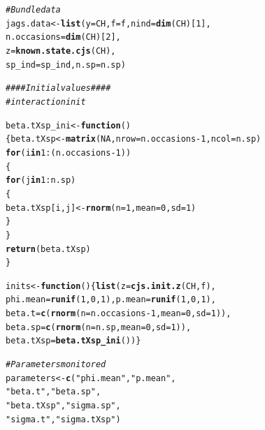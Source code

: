 \documentclass[a4paper, 10pt]{scrartcl}\usepackage[]{graphicx}\usepackage[]{color}
\makeatletter
\newcommand{\hlnum}[1]{\textcolor[rgb]{0.686,0.059,0.569}{#1}}%
\newcommand{\hlstr}[1]{\textcolor[rgb]{0.192,0.494,0.8}{#1}}%
\newcommand{\hlcom}[1]{\textcolor[rgb]{0.678,0.584,0.686}{\textit{#1}}}%
\newcommand{\hlopt}[1]{\textcolor[rgb]{0,0,0}{#1}}%
\newcommand{\hlstd}[1]{\textcolor[rgb]{0.345,0.345,0.345}{#1}}%
\newcommand{\hlkwa}[1]{\textcolor[rgb]{0.161,0.373,0.58}{\textbf{#1}}}%
\newcommand{\hlkwb}[1]{\textcolor[rgb]{0.69,0.353,0.396}{#1}}%
\newcommand{\hlkwc}[1]{\textcolor[rgb]{0.333,0.667,0.333}{#1}}%
\newcommand{\hlkwd}[1]{\textcolor[rgb]{0.737,0.353,0.396}{\textbf{#1}}}%
\newenvironment{kframe}{%
 \def\at@end@of@kframe{}%
 \ifinner\ifhmode%
  \def\at@end@of@kframe{\end{minipage}}%
  \begin{minipage}{\columnwidth}%
 \fi\fi%
 \def\FrameCommand##1{\hskip\@totalleftmargin \hskip-\fboxsep
 \colorbox{shadecolor}{##1}\hskip-\fboxsep
     \hskip-\linewidth \hskip-\@totalleftmargin \hskip\columnwidth}%
 \MakeFramed {\advance\hsize-\width
   \@totalleftmargin\z@ \linewidth\hsize
   \@setminipage}}%
 {\par\unskip\endMakeFramed%
 \at@end@of@kframe}
\newenvironment{knitrout}{}{} %
\makeatother
\begin{document}
\begin{knitrout}
\color{fgcolor}\begin{kframe}
\begin{alltt}
\hlcom{# Bundle data}
\hlstd{jags.data} \hlkwb{<-} \hlkwd{list}\hlstd{(}\hlkwc{y} \hlstd{= CH,} \hlkwc{f} \hlstd{= f,} \hlkwc{nind} \hlstd{=} \hlkwd{dim}\hlstd{(CH)[}\hlnum{1}\hlstd{],}
                  \hlkwc{n.occasions} \hlstd{=} \hlkwd{dim}\hlstd{(CH)[}\hlnum{2}\hlstd{],}
                  \hlkwc{z} \hlstd{=} \hlkwd{known.state.cjs}\hlstd{(CH),}
                  \hlkwc{sp_ind}\hlstd{=sp_ind,} \hlkwc{n.sp}\hlstd{=n.sp)}

\hlcom{#### Initial values####}
\hlcom{#interaction init}

\hlstd{beta.tXsp_ini}\hlkwb{<-}\hlkwa{function}\hlstd{()}
\hlstd{\{beta.tXsp}\hlkwb{<-}\hlkwd{matrix}\hlstd{(}\hlnum{NA}\hlstd{,}\hlkwc{nrow} \hlstd{= n.occasions}\hlopt{-}\hlnum{1}\hlstd{,}\hlkwc{ncol} \hlstd{= n.sp)}
\hlkwa{for} \hlstd{(i} \hlkwa{in} \hlnum{1}\hlopt{:}\hlstd{(n.occasions}\hlopt{-}\hlnum{1}\hlstd{))}
  \hlstd{\{}
    \hlkwa{for} \hlstd{(j} \hlkwa{in} \hlnum{1}\hlopt{:}\hlstd{n.sp)}
      \hlstd{\{}
        \hlstd{beta.tXsp[i,j]}\hlkwb{<-}\hlkwd{rnorm}\hlstd{(}\hlkwc{n} \hlstd{=} \hlnum{1}\hlstd{,}\hlkwc{mean} \hlstd{=} \hlnum{0}\hlstd{,}\hlkwc{sd} \hlstd{=} \hlnum{1}\hlstd{)}
      \hlstd{\}}
  \hlstd{\}}
\hlkwd{return}\hlstd{(beta.tXsp)}
\hlstd{\}}

\hlstd{inits} \hlkwb{<-} \hlkwa{function}\hlstd{()\{}\hlkwd{list}\hlstd{(}\hlkwc{z} \hlstd{=} \hlkwd{cjs.init.z}\hlstd{(CH, f),}
                \hlkwc{phi.mean} \hlstd{=} \hlkwd{runif}\hlstd{(}\hlnum{1}\hlstd{,} \hlnum{0}\hlstd{,} \hlnum{1}\hlstd{),} \hlkwc{p.mean} \hlstd{=} \hlkwd{runif}\hlstd{(}\hlnum{1}\hlstd{,} \hlnum{0}\hlstd{,} \hlnum{1}\hlstd{),}
                \hlkwc{beta.t}\hlstd{=}\hlkwd{c}\hlstd{(}\hlkwd{rnorm}\hlstd{(}\hlkwc{n} \hlstd{= n.occasions}\hlopt{-}\hlnum{1}\hlstd{,}\hlkwc{mean} \hlstd{=} \hlnum{0}\hlstd{,}\hlkwc{sd}\hlstd{=}\hlnum{1} \hlstd{) ),}
                \hlkwc{beta.sp}\hlstd{=}\hlkwd{c}\hlstd{(}\hlkwd{rnorm}\hlstd{(}\hlkwc{n} \hlstd{= n.sp,}\hlkwc{mean} \hlstd{=} \hlnum{0}\hlstd{,}\hlkwc{sd}\hlstd{=}\hlnum{1} \hlstd{) ),}
                \hlkwc{beta.tXsp}\hlstd{=} \hlkwd{beta.tXsp_ini}\hlstd{() )\}}

\hlcom{# Parameters monitored}
\hlstd{parameters} \hlkwb{<-} \hlkwd{c}\hlstd{(}\hlstr{"phi.mean"}\hlstd{,} \hlstr{"p.mean"}\hlstd{,}
                \hlstr{"beta.t"}\hlstd{,}\hlstr{"beta.sp"}\hlstd{,}
                \hlstr{"beta.tXsp"}\hlstd{,} \hlstr{"sigma.sp"}\hlstd{,}
                \hlstr{"sigma.t"}\hlstd{,} \hlstr{"sigma.tXsp"}\hlstd{)}


\end{alltt}
\end{kframe}
\end{knitrout}
\end{document}
